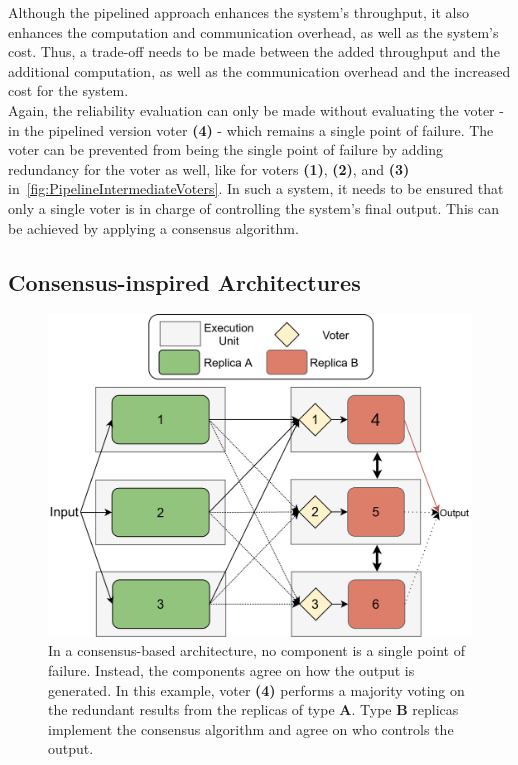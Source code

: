 \noindent
Although the pipelined approach enhances the system's throughput, it also enhances the computation and communication overhead, as well as the system's cost.
Thus, a trade-off needs to be made between the added throughput and the additional computation,  as well as the communication overhead and the increased cost for the system.
\\

\noindent
Again, the reliability evaluation can only be made without evaluating the voter - in the pipelined version voter \textbf{(4)} - which remains a single point of failure.
The voter can be prevented from being the single point of failure by adding redundancy for the voter as well, like for voters \textbf{(1)}, \textbf{(2)}, and \textbf{(3)} in~\autoref{fig:PipelineIntermediateVoters}.
In such a system, it needs to be ensured that only a single voter is in charge of controlling the system's final output.
This can be achieved by applying a consensus algorithm.

\subsection{Consensus-inspired Architectures}
\label{subsec:consensusArchitecture}
\begin{figure}[!h]
	\centering
	\includegraphics[width=0.8\linewidth]{images/ThreeComponentConsensus}
	\caption{In a consensus-based architecture, no component is a single point of failure. Instead, the components agree on how the output is generated. In this example, voter \textbf{(4)} performs a majority voting on the redundant results from the replicas of type \textbf{A}. Type \textbf{B} replicas implement the consensus algorithm and agree on who controls the output.}
	\label{fig:ThreeRepConsensus}
\end{figure}

